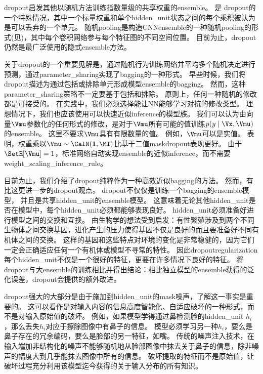 \gls{dropout}启发其他以随机方法训练指数量级的共享权重的\gls{ensemble}。
是
\gls{dropout}的一个特殊情况，其中一个标量权重和单个\gls{hidden_unit}状态之间的每个乘积被认为是可以丢弃的一个单元\citep{Wan+al-ICML2013-small}。
随机\gls{pooling}是构造\gls{CNN}\gls{ensemble}的一种随机\gls{pooling}的形式(见)，其中每个卷积网络参与每个特征图的不同空间位置。
目前为止，\gls{dropout}仍然是最广泛使用的隐式\gls{ensemble}方法。

关于\gls{dropout}的一个重要见解是，通过随机行为训练网络并平均多个随机决定进行预测，通过\gls{parameter_sharing}实现了\gls{bagging}的一种形式。
早些时候，我们将\gls{dropout}描述为通过包括或排除单元形成模型\gls{ensemble}的\gls{bagging}。
然而，这种\gls{parameter_sharing}策略不一定要基于包括和排除。
原则上，任何一种随机的修改都是可接受的。
在实践中，我们必须选择能让\gls{NN}能够学习对抗的修改类型。
理想情况下，我们也应该使用可以快速近似\gls{inference}的模型族。
我们可以认为由向量$\Vmu$参数化的任何形式的修改，是对于$\Vmu$所有可能的值训练$p(y \mid \Vx, \Vmu)$的\gls{ensemble}。
这里不要求$\Vmu$具有有限数量的值。
例如，$\Vmu$可以是实值。
\cite{Srivastava14}表明，权重乘以$\Vmu \sim \CalN(\mathbf{1}, \MI)$比基于二值\gls{mask}\gls{dropout}表现更好。
由于$\SetE[\Vmu] = 1$，标准网络自动实现\gls{ensemble}的近似\gls{inference}，而不需要\gls{weight_scaling_inference_rule}。


目前为止，我们介绍了\gls{dropout}纯粹作为一种高效近似\gls{bagging}的方法。
然而，有比这更进一步的\gls{dropout}观点。
\gls{dropout}不仅仅是训练一个\gls{bagging}的\gls{ensemble}模型，
并且是共享\gls{hidden_unit}的\gls{ensemble}模型。
这意味着无论其他\gls{hidden_unit}是否在模型中，每个\gls{hidden_unit}必须都能够表现良好。
\gls{hidden_unit}必须准备好进行模型之间的交换和互换。
\cite{Hinton-et-al-arxiv2012-small}由生物学的想法受到启发：有性繁殖涉及到两个不同生物体之间交换基因，进化产生的压力使得基因不仅是良好的而且要准备好不同有机体之间的交换。
这样的基因和这些特点对环境的变化是非常稳健的，因为它们一定会正确适应任何一个有机体或模型不寻常的特性。
因此\gls{dropout}\gls{regularization}每个\gls{hidden_unit}不仅是一个很好的特征，更要在许多情况下良好的特征。
\cite{WardeFarley+al-ICLR2014}将\gls{dropout}与大\gls{ensemble}的训练相比并得出结论：相比独立模型的\gls{ensemble}获得的泛化误差，\gls{dropout}会提供的额外改进。

\gls{dropout}强大的大部分是由于施加到\gls{hidden_unit}的\gls{mask}噪声，了解这一事实是重要的。
这可以看作是对输入内容的信息高度智能化、自适应破坏的一种形式，而不是对输入原始值的破坏。
例如，如果模型学得通过鼻检测脸的\gls{hidden_unit} $h_i$，那么丢失$h_i$对应于擦除图像中有鼻子的信息。
模型必须学习另一种$h_i$，要么是鼻子存在的冗余编码，要么是脸部的另一特征，如嘴。
传统的噪声注入技术，在输入端加非结构化的噪声不能够随机地从脸部图像中抹去关于鼻子的信息，除非噪声的幅度大到几乎能抹去图像中所有的信息。
破坏提取的特征而不是原始值，让破坏过程充分利用该模型迄今获得的关于输入分布的所有知识。


